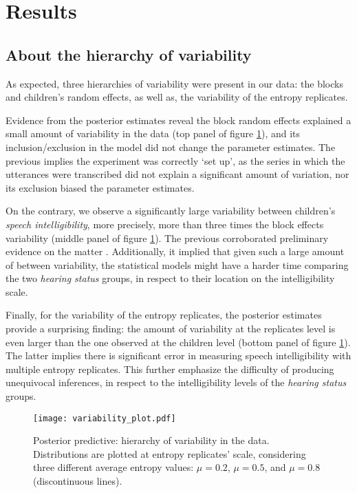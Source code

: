 \section{Results} \label{S:results}
%
\subsection{About the hierarchy of variability} \label{sS:results_variability}
%
As expected, three hierarchies of variability were present in our data: the blocks and children's random effects, as well as, the variability of the entropy replicates.

Evidence from the posterior estimates reveal the block random effects explained a small amount of variability in the data (top panel of figure \ref{fig:variability}), and its inclusion/exclusion in the model did not change the parameter estimates. The previous implies the experiment was correctly `set up', as the series in which the utterances were transcribed did not explain a significant amount of variation, nor its exclusion biased the parameter estimates.

On the contrary, we observe a significantly large variability between children's \textit{speech intelligibility}, more precisely, more than three times the block effects variability (middle panel of figure \ref{fig:variability}). The previous corroborated preliminary evidence on the matter \cite{Young_et_al_2002, Peng_et_al_2004, Montag_et_al_2014, Castellanos_et_al_2014, Yanbay_et_al_2014, Nittrouer_et_al_2014, Freeman_et_al_2017, Boonen_et_al_2021}. Additionally, it implied that given such a large amount of between variability, the statistical models might have a harder time comparing the two \textit{hearing status} groups, in respect to their location on the intelligibility scale.

Finally, for the variability of the entropy replicates, the posterior estimates provide a surprising finding: the amount of variability at the replicates level is even larger than the one observed at the children level (bottom panel of figure \ref{fig:variability}). The latter implies there is significant error in measuring speech intelligibility with multiple entropy replicates. This further emphasize the difficulty of producing unequivocal  inferences, in respect to the intelligibility levels of the \textit{hearing status} groups.
%
\begin{figure}[!h]
	\centering
	\texttt{[image: variability\_plot.pdf]}
	\caption[Posterior predictive: hierarchy of variability in the data]{Posterior predictive: hierarchy of variability in the data. Distributions are plotted at entropy replicates' scale, considering three different average entropy values: $\mu=0.2$, $\mu=0.5$, and $\mu=0.8$ (discontinuous lines). }
	\label{fig:variability}
\end{figure}
%
